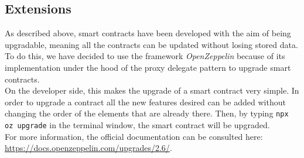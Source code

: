 \subsection{Extensions}  %
As described above, smart contracts have been developed with the aim of being upgradable, meaning all the contracts can be updated without losing stored data. \\
To do this, we have decided to use the framework \textit{OpenZeppelin} because of its implementation under the hood of the proxy delegate pattern to upgrade smart contracts. \\
On the developer side, this makes the upgrade of a smart contract very simple. In order to upgrade a contract all the new features desired can be added without changing the order of the elements that are already there. Then, by typing \texttt{npx oz upgrade} in the terminal window, the smart contract will be upgraded. \\
For more information, the official documentation can be consulted here: \url{https://docs.openzeppelin.com/upgrades/2.6/}.
